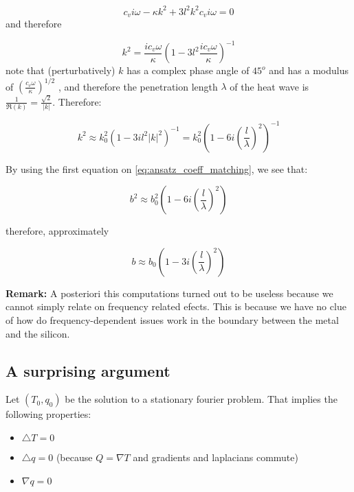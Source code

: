 \documentclass[a4paper, 11pt]{article}
\begin{document}
\begin{equation}
		{c_v i \omega -\kappa k^2+ 3 l^2 k^2 c_v i \omega = 0}
\end{equation}
and therefore

\begin{equation}
	k^2 = \frac{i c_v \omega}{\kappa} \left(1 - 3l^2\frac{i c_v \omega}{\kappa}\right)^{-1}
\end{equation}
note that (perturbatively) $k$ has a complex phase angle of $45^{o}$ and has a modulus of $\left(\frac{ c_v \omega}{\kappa}\right)^{1/2}$ , and therefore the penetration length $\lambda$ of the heat wave is $\frac{1}{\Re(k)} = \frac{\sqrt 2}{|k|}$. Therefore:

\begin{equation}
	k^2 \approx k_0^2 \left(1 - 3 i l^2
	|k|^2\right)^{-1} = k_0^2 \left(1 - 6 i \left(\frac{l}{\lambda}\right)^2\right)^{-1}
\end{equation}

By using the first equation on \eqref{eq:ansatz_coeff_matching}, we see that:

\begin{equation}
	b^2 \approx b_0^2 \left(1 - 6 i \left(\frac{l}{\lambda}\right)^2\right)
\end{equation}

therefore, approximately


\begin{equation}
	b \approx b_0 \left(1 - 3 i \left(\frac{l}{\lambda}\right)^2\right)
\end{equation}

\textbf{Remark:} A posteriori this computations turned out to be useless because we cannot simply relate on frequency related efects. This is because we have no clue of how do frequency-dependent issues work in the boundary between the metal and the silicon.

\subsection{A surprising argument} %
\label{sub:a_surprising_argument}

Let $(T_0,q_0)$ be the solution to a stationary fourier problem. That implies the following properties:

\begin{itemize}
	\item $\triangle T = 0$
	\item $\triangle q = 0$ (because $Q=\nabla T$ and gradients and laplacians commute)
	\item $\nabla q = 0$
\end{itemize}
\end{document}
